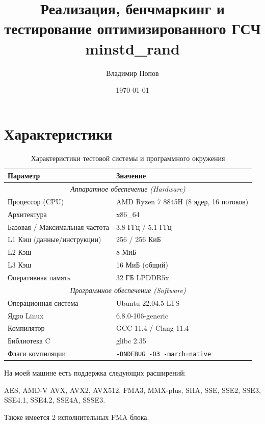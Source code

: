 \documentclass[12pt]{extarticle}
\title{Реализация, бенчмаркинг и тестирование оптимизированного ГСЧ minstd\_rand}
\author{Владимир Попов}
\date{\today}
\begin{document}
\maketitle

\newpage

\tableofcontents

\newpage

\section{Характеристики}

\begin{table}[ht]
\centering
\label{tab:system_specs}
\begin{tabular}{ll}
\toprule
\textbf{Параметр} & \textbf{Значение} \\
\midrule
\multicolumn{2}{c}{\textit{Аппаратное обеспечение (Hardware)}} \\
\midrule
Процессор (CPU) & AMD Ryzen 7 8845H (8 ядер, 16 потоков) \\
Архитектура & x86\_64 \\
Базовая / Максимальная частота & 3.8 ГГц / 5.1 ГГц \\
L1 Кэш (данные/инструкции) & 256 / 256 КиБ \\
L2 Кэш & 8 МиБ \\
L3 Кэш & 16 МиБ (общий) \\
Оперативная память & 32 ГБ LPDDR5x \\
\midrule
\multicolumn{2}{c}{\textit{Программное обеспечение (Software)}} \\
\midrule
Операционная система & Ubuntu 22.04.5 LTS \\
Ядро Linux & 6.8.0-106-generic \\
Компилятор & GCC 11.4 / Clang 11.4 \\
Библиотека C & glibc 2.35 \\
Флаги компиляции & \texttt{-DNDEBUG -O3 -march=native} \\
\bottomrule
\end{tabular}

\caption{Характеристики тестовой системы и программного окружения}
\end{table}

На моей машине есть поддержка следующих расширений:

AES, AMD-V  AVX, AVX2, AVX512, FMA3, MMX-plus, SHA, SSE, SSE2, SSE3, SSE4.1, SSE4.2, SSE4A, SSSE3.

Также имеется 2 исполнительных FMA блока.
\end{document}
